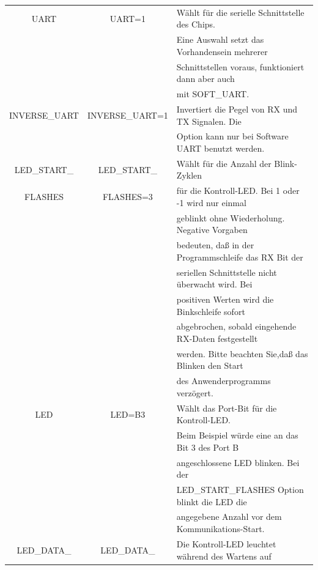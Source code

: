 \begin{table}[H]
\begin{center}
\begin{tabular}{| c | c | l |}
    \hline
    UART           & UART=1         & Wählt für die  serielle Schnittstelle des Chips. \\
                   &                & Eine Auswahl setzt das Vorhandensein mehrerer \\
                   &                & Schnittstellen voraus, funktioniert dann aber auch \\
		   &                & mit SOFT\_UART. \\
    \hline
    INVERSE\_UART  & INVERSE\_UART=1 & Invertiert die Pegel von RX und TX Signalen. Die \\
	           &                & Option kann nur bei Software UART benutzt werden.\\
    \hline
 LED\_START\_      & LED\_START\_   & Wählt für die Anzahl der Blink-Zyklen \\
   FLASHES         &   FLASHES=3    & für die Kontroll-LED. Bei 1 oder -1 wird nur einmal \\
                   &                & geblinkt ohne Wiederholung. Negative Vorgaben \\
                   &                & bedeuten, daß in der Programmschleife das RX Bit der \\
                   &                & seriellen Schnittstelle nicht überwacht wird. Bei \\ 
                   &                & positiven Werten wird die Binkschleife sofort \\
		   &                & abgebrochen, sobald eingehende RX-Daten festgestellt \\
                   &                & werden. Bitte beachten Sie,daß das Blinken den Start \\
                   &                & des Anwenderprogramms verzögert. \\
    \hline
 LED               & LED=B3         & Wählt das Port-Bit für die  Kontroll-LED. \\
                   &                & Beim Beispiel würde eine an das Bit 3 des Port B \\ 
                   &                & angeschlossene LED blinken. Bei der \\
                   &                & LED\_START\_FLASHES  Option  blinkt die LED die\\
                   &                & angegebene Anzahl vor dem Kommunikations-Start. \\
    \hline
 LED\_DATA\_       & LED\_DATA\_    & Die Kontroll-LED leuchtet während des Wartens auf \\

\end{tabular}
\end{center}
\end{table}

